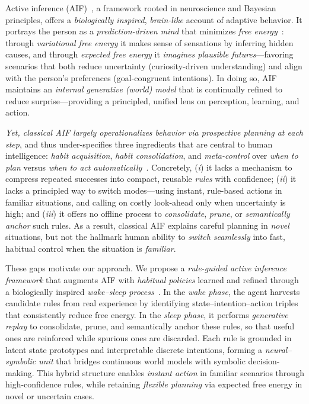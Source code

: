 \documentclass{article} %
\begin{document}
Active inference (AIF)~\citep{mazzaglia2022free}, a framework rooted in neuroscience and Bayesian principles, offers a \emph{biologically inspired}, \emph{brain-like} account of adaptive behavior. It portrays the person as a \emph{prediction-driven mind} that minimizes \emph{free energy}~\citep{parr2019generalised, millidge2021whence}: through \emph{variational free energy} it makes sense of sensations by inferring hidden causes, and through \emph{expected free energy} it \emph{imagines plausible futures}—favoring scenarios that both reduce uncertainty (curiosity-driven understanding) and align with the person’s preferences (goal-congruent intentions). In doing so, AIF maintains an \emph{internal generative (world) model} that is continually refined to reduce surprise—providing a principled, unified lens on perception, learning, and action.

\emph{Yet, classical AIF largely operationalizes behavior via prospective planning at each step}, and thus under-specifies three ingredients that are central to human intelligence: \emph{habit acquisition}, \emph{habit consolidation}, and \emph{meta-control} over \emph{when to plan} versus \emph{when to act automatically}~\citep{han2024synergizing, dung2024r}. Concretely, ({\it i}) it lacks a mechanism to compress repeated successes into compact, reusable \emph{rules} with confidence; ({\it ii}) it lacks a principled way to switch modes—using instant, rule-based actions in familiar situations, and calling on costly look-ahead only when uncertainty is high; and ({\it iii}) it offers no offline process to \emph{consolidate}, \emph{prune}, or \emph{semantically anchor} such rules. As a result, classical AIF explains careful planning in \emph{novel} situations, but not the hallmark human ability to \emph{switch seamlessly} into fast, habitual control when the situation is \emph{familiar}.

These gaps motivate our approach. We propose a \emph{rule-guided active inference framework} that augments AIF with \emph{habitual policies} learned and refined through a biologically inspired \emph{wake--sleep process}~\citep{hinton1995wake, hewitt2020learning,  ellis2023dreamcoder}. In the \emph{wake phase}, the agent harvests candidate rules from real experience by identifying state--intention--action triples that consistently reduce free energy. In the \emph{sleep phase}, it performs \emph{generative replay} to consolidate, prune, and semantically anchor these rules, so that useful ones are reinforced while spurious ones are discarded. Each rule is grounded in latent state prototypes and interpretable discrete intentions, forming a \emph{neural--symbolic unit} that bridges continuous world models with symbolic decision-making. This hybrid structure enables \emph{instant action} in familiar scenarios through high-confidence rules, while retaining \emph{flexible planning} via expected free energy in novel or uncertain cases. 
\end{document}
